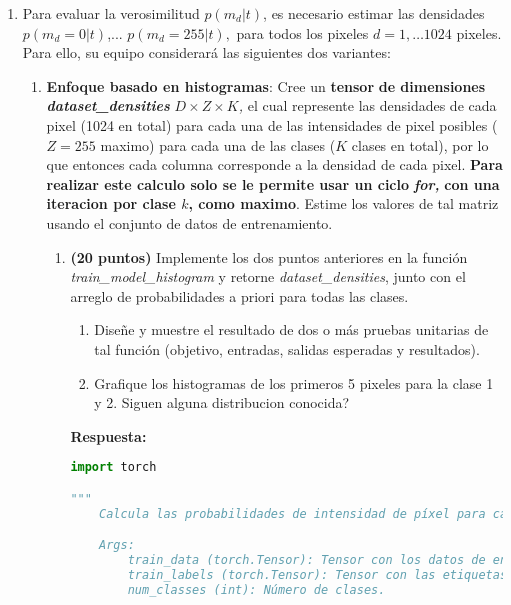 \documentclass[spanish]{article}
\begin{document}
\begin{enumerate}
\begin{enumerate}
\item Para evaluar la verosimilitud $p\left(m_{d}|t\right)$, es necesario
estimar las densidades $p\left(m_{d}=0|t\right)$,... $p\left(m_{d}=255|t\right),$
para todos los pixeles $d=1,\ldots1024$ pixeles. Para ello, su equipo
considerará las siguientes dos variantes:
\begin{enumerate}
\item \textbf{Enfoque basado en histogramas}: Cree un \textbf{tensor}\textbf{\emph{
}}\textbf{de dimensiones }\textbf{\emph{dataset\_densities}}\textbf{
}$D\times Z\times K$\emph{, }el cual represente las densidades de
cada pixel (1024 en total) para cada una de las intensidades de pixel
posibles ($Z=255$ maximo) para cada una de las clases ($K$ clases
en total), por lo que entonces cada columna corresponde a la densidad
de cada pixel. \textbf{Para realizar este calculo solo se le permite
usar un ciclo }\textbf{\emph{for, }}\textbf{con una iteracion por
clase $k$, como maximo}. Estime los valores de tal matriz usando
el conjunto de datos de entrenamiento. 
\begin{enumerate}
\item \textbf{(20 puntos)} Implemente los dos puntos anteriores en la función
\emph{train\_model\_histogram }y retorne \emph{dataset\_densities},
junto con el arreglo de probabilidades a priori para todas las clases. 
\begin{enumerate}
\item Diseñe y muestre el resultado de dos o más pruebas unitarias de tal
función (objetivo, entradas, salidas esperadas y resultados).
\item Grafique los histogramas de los primeros 5 pixeles para la clase 1
y 2. Siguen alguna distribucion conocida?
\end{enumerate}


\vspace{15px}
\par \textbf{Respuesta:}
\begin{lstlisting}[language=Python, caption=Calculo de probabilidad por intensidad de pixel]
import torch

"""
    Calcula las probabilidades de intensidad de píxel para cada clase en un conjunto de datos de imágenes.

    Args:
        train_data (torch.Tensor): Tensor con los datos de entrenamiento de forma [num_images, image_height, image_width].
        train_labels (torch.Tensor): Tensor con las etiquetas de entrenamiento de forma [num_images].
        num_classes (int): Número de clases.


\end{lstlisting}
\end{enumerate}
\end{enumerate}
\end{enumerate}
\end{enumerate}
\end{document}
